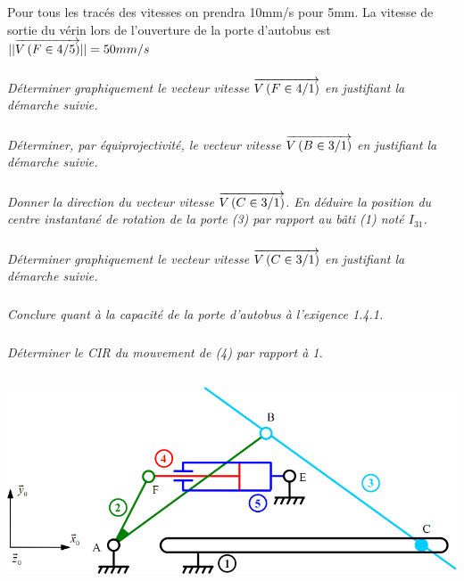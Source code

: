 \documentclass[10pt]{article}
\begin{document}
Pour tous les tracés des vitesses on prendra 10mm/s pour 5mm.
 La vitesse de sortie du vérin lors de l'ouverture de la porte d'autobus est $||\overrightarrow{V\left( {F} \in {4}/{5}\right)}||=50mm/s$

\subparagraph{}
\textit{Déterminer graphiquement le vecteur vitesse $\overrightarrow{V\left( {F} \in {4}/{1}\right)}$ en justifiant la démarche suivie. }

\subparagraph{}
\textit{Déterminer, par équiprojectivité, le vecteur vitesse $\overrightarrow{V\left( {B} \in {3}/{1}\right)}$ en justifiant la démarche suivie.}

\subparagraph{}
\textit{Donner la direction du vecteur vitesse $\overrightarrow{V\left( {C} \in {3}/{1}\right)}$. En déduire la position du centre instantané de rotation de la porte (3) par rapport au bâti (1) noté $I_{31}$.}

\subparagraph{}
\textit{Déterminer graphiquement le vecteur vitesse $\overrightarrow{V\left( {C} \in {3}/{1}\right)}$ en justifiant la démarche suivie.}

\subparagraph{}
\textit{Conclure quant à la capacité de  la porte d'autobus à l'exigence 1.4.1.}

\subparagraph{}
\textit{Déterminer le CIR du mouvement de (4) par rapport à 1.}

\newpage

$$\quad$$

\vspace{15cm}

\begin{center}
\includegraphics[width=.8\textwidth]{images/fig7}
\end{center}
\end{document}
